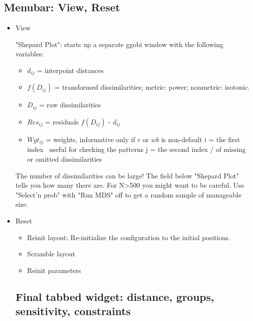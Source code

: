 \documentclass[11pt]{article}
\begin{document}
\subsection{Menubar: View, Reset}

\begin{itemize}

\item View

"Shepard Plot": starts up a separate ggobi window with the following
   variables:
\begin{itemize}
\item
   $d_{ij}$     = interpoint distances
\item
   $f(D_{ij})$  = transformed dissimilarities; 
              metric: power; nonmetric: isotonic.
\item
   $D_{ij}$     = raw dissimilarities
\item
   $Res_{ij}$   = residuals $f(D_{ij})$ - $d_{ij}$
\item
   $Wgt_{ij}$   = weights, informative only if $r$ or $wb$ is non-default
   i        = the first index  \   useful for checking the patterns
   j        = the second index /   of missing or omitted dissimilarities
\end{itemize}
              
   The number of dissimilarities can be large!  The field below
   "Shepard Plot" tells you how many there are.  For N>500 you might
   want to be careful.  Use "Select'n prob" with "Run MDS" off to get
   a random sample of manageable size.

\item Reset
  \begin{itemize}
  \item
  Reinit layout: Re-initialize the configuration to the initial positions.
  \item
  Scramble layout
  \item
  Reinit parameters


  \end{itemize}

\subsection{Final tabbed widget: distance, groups, sensitivity, constraints}


\end{itemize}
\end{document}
